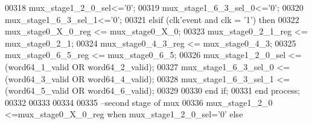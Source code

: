 \begin{DoxyCode}
00318          \textcolor{vhdlchar}{mux_stage1_2_0_sel}\textcolor{vhdlchar}{<=}\textcolor{vhdlchar}{'}\textcolor{vhdllogic}{}\textcolor{vhdllogic}{0}\textcolor{vhdlchar}{'};
00319          \textcolor{vhdlchar}{mux_stage1_6_3_sel_0}\textcolor{vhdlchar}{<=}\textcolor{vhdlchar}{'}\textcolor{vhdllogic}{}\textcolor{vhdllogic}{0}\textcolor{vhdlchar}{'};
00320          \textcolor{vhdlchar}{mux_stage1_6_3_sel_1}\textcolor{vhdlchar}{<=}\textcolor{vhdlchar}{'}\textcolor{vhdllogic}{}\textcolor{vhdllogic}{0}\textcolor{vhdlchar}{'};
00321       \textcolor{keywordflow}{elsif} \textcolor{vhdlchar}{(}\textcolor{vhdlchar}{clk}\textcolor{vhdlchar}{'}\textcolor{vhdlkeyword}{event} \textcolor{keywordflow}{and} \textcolor{vhdlchar}{clk} \textcolor{vhdlchar}{=} \textcolor{vhdlchar}{'}\textcolor{vhdllogic}{}\textcolor{vhdllogic}{1}\textcolor{vhdlchar}{'}\textcolor{vhdlchar}{)} \textcolor{keywordflow}{then}
00322             \textcolor{vhdlchar}{mux_stage0_X_0_reg} \textcolor{vhdlchar}{<=} \textcolor{vhdlchar}{mux_stage0_X_0};
00323             \textcolor{vhdlchar}{mux_stage0_2_1_reg} \textcolor{vhdlchar}{<=} \textcolor{vhdlchar}{mux_stage0_2_1};
00324             \textcolor{vhdlchar}{mux_stage0_4_3_reg} \textcolor{vhdlchar}{<=} \textcolor{vhdlchar}{mux_stage0_4_3};
00325             \textcolor{vhdlchar}{mux_stage0_6_5_reg} \textcolor{vhdlchar}{<=} \textcolor{vhdlchar}{mux_stage0_6_5};
00326          \textcolor{vhdlchar}{mux_stage1_2_0_sel} \textcolor{vhdlchar}{<=} \textcolor{vhdlchar}{(}\textcolor{vhdlchar}{word64_1_valid} \textcolor{keywordflow}{OR} \textcolor{vhdlchar}{word64_2_valid}\textcolor{vhdlchar}{)};
00327          \textcolor{vhdlchar}{mux_stage1_6_3_sel_0} \textcolor{vhdlchar}{<=} \textcolor{vhdlchar}{(}\textcolor{vhdlchar}{word64_3_valid} \textcolor{keywordflow}{OR} \textcolor{vhdlchar}{word64_4_valid}\textcolor{vhdlchar}{)};  
00328          \textcolor{vhdlchar}{mux_stage1_6_3_sel_1} \textcolor{vhdlchar}{<=} \textcolor{vhdlchar}{(}\textcolor{vhdlchar}{word64_5_valid} \textcolor{keywordflow}{OR} \textcolor{vhdlchar}{word64_6_valid}\textcolor{vhdlchar}{)};
00329       
00330         \textcolor{keywordflow}{end} \textcolor{keywordflow}{if};
00331     \textcolor{keywordflow}{end} \textcolor{keywordflow}{process};
00332 
00333 
00334 
00335 \textcolor{keyword}{--second stage of mux}
00336 \textcolor{vhdlchar}{mux_stage1_2_0}  \textcolor{vhdlchar}{<=}\textcolor{vhdlchar}{mux_stage0_X_0_reg} \textcolor{keywordflow}{when} \textcolor{vhdlchar}{mux_stage1_2_0_sel}\textcolor{vhdlchar}{=}\textcolor{vhdlchar}{'}\textcolor{vhdllogic}{}\textcolor{vhdllogic}{0}\textcolor{vhdlchar}{'} \textcolor{keywordflow}{else} \textcolor{vhdlchar}{
}
\end{DoxyCode}
